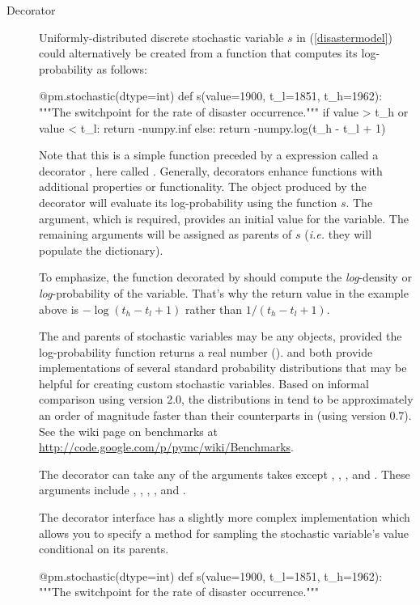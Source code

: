 \documentclass[]{jss}
\begin{document}
\begin{description}
    \item[Decorator] Uniformly-distributed discrete stochastic variable $s$ in (\ref{disastermodel}) could alternatively be created from a function that computes its log-probability as follows:
\begin{CodeInput}
@pm.stochastic(dtype=int)
def s(value=1900, t_l=1851, t_h=1962):
"""The switchpoint for the rate of disaster occurrence."""
if value > t_h or value < t_l:
    return -numpy.inf
else:
    return -numpy.log(t_h - t_l + 1)
\end{CodeInput}
Note that this is a simple  function preceded by a  expression called a decorator \citep{python}, here called . Generally, decorators enhance functions with additional properties or functionality. The  object produced by the  decorator will evaluate its log-probability using the function $s$. The  argument, which is required, provides an initial value for the variable. The remaining arguments will be assigned as parents of $s$ (\emph{i.e.} they will populate the  dictionary).

To emphasize, the  function decorated by  should compute the \emph{log}-density or \emph{log}-probability of the variable. That's why the return value in the example above is $-\log(t_h-t_l+1)$ rather than $1/(t_h-t_l+1)$.

The  and parents of stochastic variables may be any objects, provided the log-probability function returns a real number ().  and  both provide implementations of several standard probability distributions that may be helpful for creating custom stochastic variables. Based on informal comparison using version 2.0, the distributions in  tend to be approximately an order of magnitude faster than their counterparts in  (using version 0.7). See the  wiki page on benchmarks at \href{http://code.google.com/p/pymc/wiki/Benchmarks}{http://code.google.com/p/pymc/wiki/Benchmarks}.

    The decorator  can take any of the arguments  takes except , , ,  and . These arguments include , , , ,  and .

    The decorator interface has a slightly more complex implementation which allows you to specify a  method for sampling the stochastic variable's value conditional on its parents.
    \begin{CodeInput}
@pm.stochastic(dtype=int)
def s(value=1900, t_l=1851, t_h=1962):
"""The switchpoint for the rate of disaster occurrence."""


\end{CodeInput}
\end{description}
\end{document}
